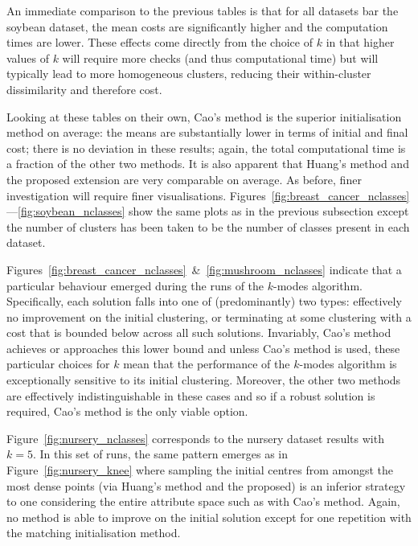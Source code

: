 An immediate comparison to the previous tables is that for all datasets bar the
soybean dataset, the mean costs are significantly higher and the computation
times are lower. These effects come directly from the choice of \(k\) in that
higher values of \(k\) will require more checks (and thus computational time)
but will typically lead to more homogeneous clusters, reducing their
within-cluster dissimilarity and therefore cost.

Looking at these tables on their own, Cao's method is the superior
initialisation method on average: the means are substantially lower in terms of
initial and final cost; there is no deviation in these results; again, the total
computational time is a fraction of the other two methods. It is also apparent
that Huang's method and the proposed extension are very comparable on average.
As before, finer investigation will require finer visualisations.
Figures~\ref{fig:breast_cancer_nclasses}---\ref{fig:soybean_nclasses} show the
same plots as in the previous subsection except the number of clusters has been
taken to be the number of classes present in each dataset.

Figures~\ref{fig:breast_cancer_nclasses}~\&~\ref{fig:mushroom_nclasses} indicate
that a particular behaviour emerged during the runs of the \(k\)-modes
algorithm. Specifically, each solution falls into one of (predominantly) two
types: effectively no improvement on the initial clustering, or terminating at
some clustering with a cost that is bounded below across all such solutions.
Invariably, Cao's method achieves or approaches this lower bound and unless
Cao's method is used, these particular choices for \(k\) mean that the
performance of the \(k\)-modes algorithm is exceptionally sensitive to its
initial clustering. Moreover, the other two methods are effectively
indistinguishable in these cases and so if a robust solution is required, Cao's
method is the only viable option.

Figure~\ref{fig:nursery_nclasses} corresponds to the nursery dataset results
with \(k=5\). In this set of runs, the same pattern emerges as in
Figure~\ref{fig:nursery_knee} where sampling the initial centres from amongst
the most dense points (via Huang's method and the proposed) is an inferior
strategy to one considering the entire attribute space such as with Cao's
method. Again, no method is able to improve on the initial solution except for
one repetition with the matching initialisation method.

